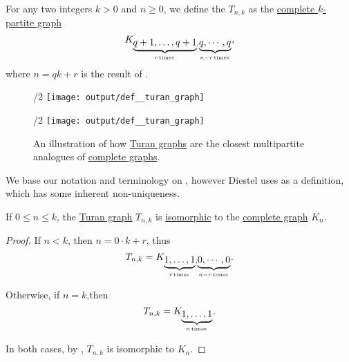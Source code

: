 \begin{definition}\label{def:turan_graph}\mimprovised
  For any two integers \( k > 0 \) and \( n \geq 0 \), we define the  \( T_{n,k} \) as the \hyperref[def:complete_multipartite_graph]{complete \( k \)-partite graph}
  \begin{equation*}
    K_{\underbrace{q+1,\ldots,q+1}_{r \T*{times}},\underbrace{q,\cdots,q}_{n - r \T*{times}}},
  \end{equation*}
  where \( n = qk + r \) is the result of .

  \begin{figure}[!ht]
    \begin{subcaptionblock}{\textwidth/2}
      \centering
      \texttt{[image: output/def\_\_turan\_graph]}
      \caption{\( K_5 \)}\label{fig:def:turan_graph/k5}
    \end{subcaptionblock}
    \hfill
    \begin{subcaptionblock}{\textwidth/2}
      \centering
      \texttt{[image: output/def\_\_turan\_graph]}
      \caption{\( T_{5,3} \)}\label{fig:def:turan_graph/t52}
    \end{subcaptionblock}
    \caption{An illustration of how \hyperref[def:turan_graph]{Turan graphs} are the closest multipartite analogues of \hyperref[def:complete_graph]{complete graphs}.}\label{fig:def:turan_graph}
  \end{figure}
\end{definition}
\begin{comments}
  \item We base our notation and terminology on \cite[165]{Diestel2005}, however Diestel uses  as a definition, which has some inherent non-uniqueness.
\end{comments}

\begin{proposition}\label{thm:small_turan_graph}
  If \( 0 \leq n \leq k \), the \hyperref[def:turan_graph]{Turan graph} \( T_{n,k} \) is \hyperref[def:undirected_graph/homomorphism]{isomorphic} to the \hyperref[def:complete_graph]{complete graph} \( K_n \).
\end{proposition}
\begin{proof}
  If \( n < k \), then \( n = 0 \cdot k + r \), thus
  \begin{equation*}
    T_{n,k} = K_{\underbrace{1,\ldots,1}_{r \T*{times}},\underbrace{0,\cdots,0}_{n - r \T*{times}}}.
  \end{equation*}

  Otherwise, if \( n = k \),then
  \begin{equation*}
    T_{n,k} = K_{\underbrace{1,\ldots,1}_{n \T*{times}}}.
  \end{equation*}

  In both cases, by , \( T_{n,k} \) is isomorphic to \( K_n \).
\end{proof}

